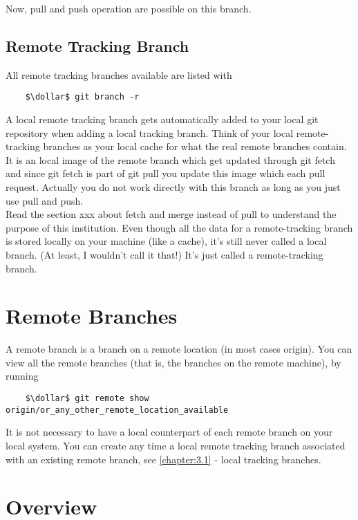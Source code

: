 Now, pull and push operation are possible on this branch.



\subsection*{Remote Tracking Branch}


All remote tracking branches available are listed with
\begin{lstlisting}
	$\dollar$ git branch -r
\end{lstlisting}

A local remote tracking branch gets automatically added to your local git repository when adding a 
local tracking branch. Think of your local remote-tracking branches as your local cache for what the real remote branches contain.
It is an local image of the remote branch which get updated through git fetch and since 
git fetch is part of git pull you update this image which each pull request. Actually you do not work directly with this branch as long as you just use 
pull and push.
\\
Read the section xxx about fetch and merge instead of pull to understand the purpose of this institution.
Even though all the data for a remote-tracking branch is stored locally on your machine (like a cache), it's still never called a local branch. 
(At least, I wouldn't call it that!) It's just called a remote-tracking branch.



\section{Remote Branches}
\label{chapter:3.2}

A remote branch is a branch on a remote location (in most cases origin). 
You can view all the remote branches (that is, the branches on the remote machine), by running 

\begin{lstlisting}
	$\dollar$ git remote show origin/or_any_other_remote_location_available
\end{lstlisting}

It is not necessary to have a local counterpart of each remote branch on your local system. You can create any time
a local remote tracking branch associated with an existing remote branch, see \cref{chapter:3.1} - local tracking branches.

\section{Overview}
\label{chapter:3.3}

